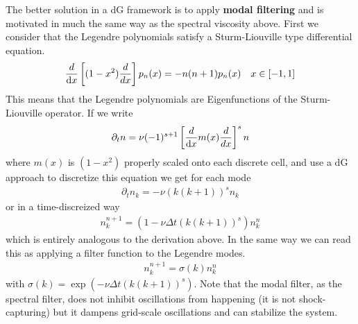 The better solution in a dG framework is to apply \textbf{modal filtering} and is motivated in much the same
way as the spectral viscosity above.
First we consider that the Legendre polynomials satisfy a Sturm-Liouville type differential equation.
\begin{align}
    \frac{d}{\mathrm{d} x} \left[ (1-x^2) \frac{ d }{d x} \right]p_n(x) = -n(n+1) p_n(x) \quad x \in [-1,1]
\end{align}
This means that the Legendre polynomials are Eigenfunctions of the Sturm-Liouville operator. If we write
\begin{align}
    \partial_t n = \nu (-1)^{s+1}\left[\frac{d}{\mathrm{d} x}  m(x) \frac{ d }{d x} \right]^s  n
\end{align}
where $m(x)$ is $(1-x^2)$ properly scaled onto each discrete cell, and use a dG approach to discretize this equation we get for each mode
\begin{align}
    \partial_t n_k = -\nu (k(k+1))^s  n_k
\end{align}
or in a time-discreized way
\begin{align}
    n_k^{n+1} = (1-\nu \Delta t (k(k+1))^s ) n_k^n
\end{align}
which is entirely analogous to the derivation above.
In the same way we can read this as applying a filter function to the Legendre modes.
\begin{align}
    n_k^{n+1} = \sigma(k) n_k^n
\end{align}
with $\sigma(k) = \exp( - \nu \Delta t (k(k+1))^s)$.
Note that the modal filter, as the spectral filter, does not inhibit oscillations from happening (it is not shock-capturing) but it dampens grid-scale oscillations
and can stabilize the system.



